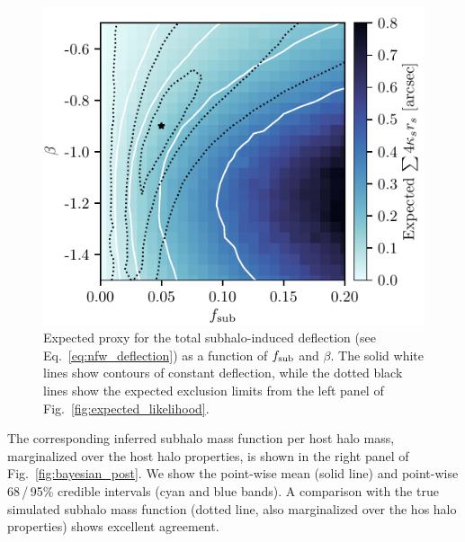 \documentclass[twocolumn]{aastex62}
\begin{document}
\begin{figure}
\centering
\includegraphics[height=0.4\textwidth]{figures/warum_ist_die_banane_krumm}  %
\caption{Expected proxy for the total subhalo-induced deflection (see Eq.~\eqref{eq:nfw_deflection}) as a function of $f_{\mathrm{sub}}$ and $\beta$. The solid white lines show contours of constant deflection, while the dotted black lines show the expected exclusion limits from the left panel of Fig.~\ref{fig:expected_likelihood}.}
\label{fig:banana}
\end{figure}

The corresponding inferred subhalo mass function per host halo mass, marginalized over the host halo properties, is shown in the right panel of Fig.~\ref{fig:bayesian_post}. We show the point-wise mean (solid line) and point-wise 68\,/\,95\% credible intervals (cyan and blue bands). A comparison with the true simulated subhalo mass function (dotted line, also marginalized over the hos halo properties) shows excellent agreement.
\end{document}
